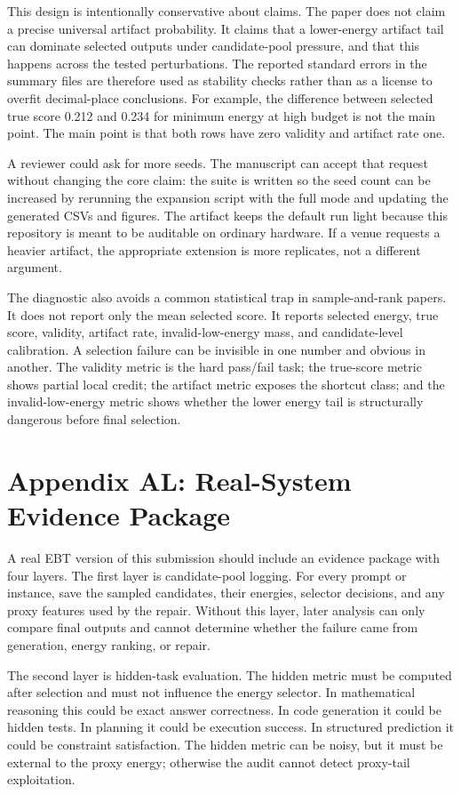 \documentclass{article}
\begin{document}
This design is intentionally conservative about claims. The paper does not
claim a precise universal artifact probability. It claims that a lower-energy
artifact tail can dominate selected outputs under candidate-pool pressure, and
that this happens across the tested perturbations. The reported standard
errors in the summary files are therefore used as stability checks rather than
as a license to overfit decimal-place conclusions. For example, the difference
between selected true score 0.212 and 0.234 for minimum energy at high budget
is not the main point. The main point is that both rows have zero validity and
artifact rate one.

A reviewer could ask for more seeds. The manuscript can accept that request
without changing the core claim: the suite is written so the seed count can be
increased by rerunning the expansion script with the full mode and updating
the generated CSVs and figures. The artifact keeps the default run light
because this repository is meant to be auditable on ordinary hardware. If a
venue requests a heavier artifact, the appropriate extension is more
replicates, not a different argument.

The diagnostic also avoids a common statistical trap in sample-and-rank
papers. It does not report only the mean selected score. It reports selected
energy, true score, validity, artifact rate, invalid-low-energy mass, and
candidate-level calibration. A selection failure can be invisible in one
number and obvious in another. The validity metric is the hard pass/fail task;
the true-score metric shows partial local credit; the artifact metric exposes
the shortcut class; and the invalid-low-energy metric shows whether the lower
energy tail is structurally dangerous before final selection.

\section*{Appendix AL: Real-System Evidence Package}

A real EBT version of this submission should include an evidence package with
four layers. The first layer is candidate-pool logging. For every prompt or
instance, save the sampled candidates, their energies, selector decisions, and
any proxy features used by the repair. Without this layer, later analysis can
only compare final outputs and cannot determine whether the failure came from
generation, energy ranking, or repair.

The second layer is hidden-task evaluation. The hidden metric must be computed
after selection and must not influence the energy selector. In mathematical
reasoning this could be exact answer correctness. In code generation it could
be hidden tests. In planning it could be execution success. In structured
prediction it could be constraint satisfaction. The hidden metric can be noisy,
but it must be external to the proxy energy; otherwise the audit cannot detect
proxy-tail exploitation.
\end{document}
